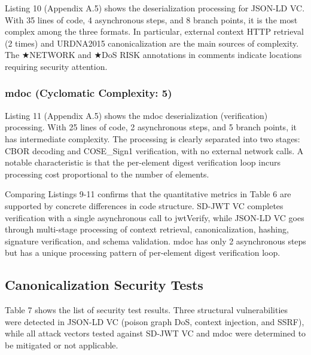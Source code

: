 \documentclass[conference]{IEEEtran}
\begin{document}
Listing 10 (Appendix A.5) shows the deserialization processing for JSON-LD VC. With 35 lines of code, 4 asynchronous steps, and 8 branch points, it is the most complex among the three formats. In particular, external context HTTP retrieval (2 times) and URDNA2015 canonicalization are the main sources of complexity. The ★NETWORK and ★DoS RISK annotations in comments indicate locations requiring security attention.

\subsubsection{mdoc (Cyclomatic Complexity: 5)}

Listing 11 (Appendix A.5) shows the mdoc deserialization (verification) processing. With 25 lines of code, 2 asynchronous steps, and 5 branch points, it has intermediate complexity. The processing is clearly separated into two stages: CBOR decoding and COSE\_Sign1 verification, with no external network calls. A notable characteristic is that the per-element digest verification loop incurs processing cost proportional to the number of elements.

Comparing Listings 9-11 confirms that the quantitative metrics in Table 6 are supported by concrete differences in code structure. SD-JWT VC completes verification with a single asynchronous call to jwtVerify, while JSON-LD VC goes through multi-stage processing of context retrieval, canonicalization, hashing, signature verification, and schema validation. mdoc has only 2 asynchronous steps but has a unique processing pattern of per-element digest verification loop.

\subsection{Canonicalization Security Tests}

Table 7 shows the list of security test results. Three structural vulnerabilities were detected in JSON-LD VC (poison graph DoS, context injection, and SSRF), while all attack vectors tested against SD-JWT VC and mdoc were determined to be mitigated or not applicable.
\end{document}
